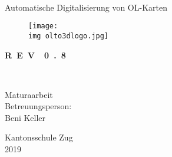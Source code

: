 \begin{titlepage}

\begin{center}

\vspace{40mm}

\huge{\textbf{\mytitle\\}}
\huge{Automatische Digitalisierung von OL-Karten\\}

\vspace{10mm}

\begin{figure}[hbt]
	\centering
	\texttt{[image: \\img olto3dlogo.jpg]}
\end{figure}

\vspace{10mm}

\color{red}
\huge{\textbf{R~E~V~~0~.~8\\}}
\color{black}

\vspace{20mm}

\Large{\textbf{\myauthor\\}}
\mydate

\vspace{15mm}

Maturaarbeit\\
Betreuungsperson:\\ 
Beni Keller

\vspace{15mm}
  
Kantonsschule Zug\\
2019


\end{center}

\end{titlepage}